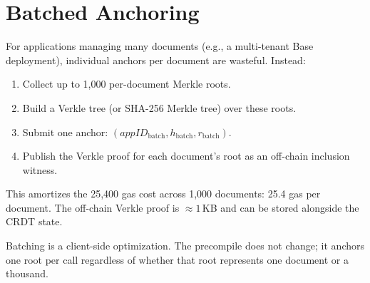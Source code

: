 \section{Batched Anchoring}

\label{sec:batching}

For applications managing many documents (e.g., a multi-tenant Base
deployment), individual anchors per document are wasteful. Instead:

\begin{enumerate}[nosep]
  \item Collect up to 1,000 per-document Merkle roots.
  \item Build a Verkle tree (or SHA-256 Merkle tree) over these roots.
  \item Submit one anchor: $(appID_{\text{batch}}, h_{\text{batch}}, r_{\text{batch}})$.
  \item Publish the Verkle proof for each document's root as an off-chain
        inclusion witness.
\end{enumerate}

\noindent
This amortizes the 25,400 gas cost across 1,000 documents: 25.4 gas per
document. The off-chain Verkle proof is $\approx 1$\,KB and can be stored
alongside the CRDT state.

Batching is a client-side optimization. The precompile does not change;
it anchors one root per call regardless of whether that root represents
one document or a thousand.


